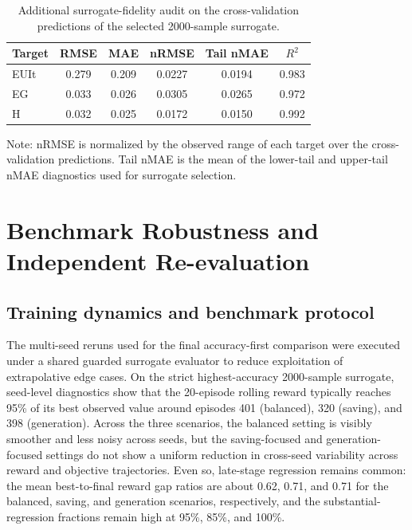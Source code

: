 \begin{table}[H]
\centering
\caption{Additional surrogate-fidelity audit on the cross-validation predictions of the selected 2000-sample surrogate.}
\label{tab:supp_fidelity}
\begin{threeparttable}
\begin{tabular*}{\linewidth}{@{\extracolsep{\fill}}lccccc@{}}
\toprule
Target & RMSE & MAE & nRMSE & Tail nMAE & $R^2$ \\
\midrule
EUIt & 0.279 & 0.209 & 0.0227 & 0.0194 & 0.983 \\
EG   & 0.033 & 0.026 & 0.0305 & 0.0265 & 0.972 \\
H    & 0.032 & 0.025 & 0.0172 & 0.0150 & 0.992 \\
\bottomrule
\end{tabular*}
\begin{tablenotes}[flushleft]
\footnotesize
\item Note: nRMSE is normalized by the observed range of each target over the cross-validation predictions. Tail nMAE is the mean of the lower-tail and upper-tail nMAE diagnostics used for surrogate selection.
\end{tablenotes}
\end{threeparttable}
\end{table}

\section{Benchmark Robustness and Independent Re-evaluation}

\subsection{Training dynamics and benchmark protocol}

The multi-seed reruns used for the final accuracy-first comparison were executed under a shared guarded surrogate evaluator to reduce exploitation of extrapolative edge cases. On the strict highest-accuracy 2000-sample surrogate, seed-level diagnostics show that the 20-episode rolling reward typically reaches 95\% of its best observed value around episodes 401 (balanced), 320 (saving), and 398 (generation). Across the three scenarios, the balanced setting is visibly smoother and less noisy across seeds, but the saving-focused and generation-focused settings do not show a uniform reduction in cross-seed variability across reward and objective trajectories. Even so, late-stage regression remains common: the mean best-to-final reward gap ratios are about 0.62, 0.71, and 0.71 for the balanced, saving, and generation scenarios, respectively, and the substantial-regression fractions remain high at 95\%, 85\%, and 100\%.

